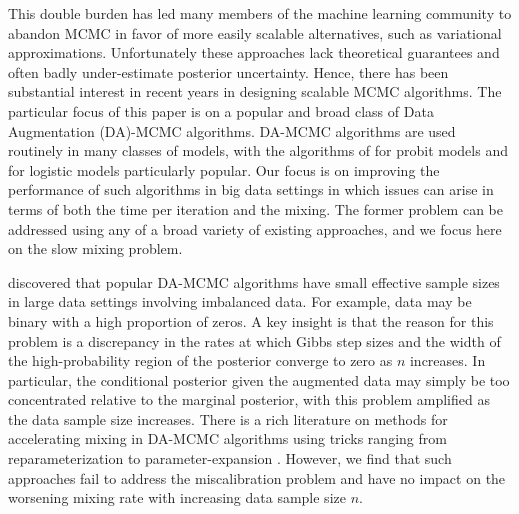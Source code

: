 \documentclass[11pt]{article}
\begin{document}
{This double burden has led many members of the machine learning community to abandon MCMC in favor of more easily scalable alternatives, such as variational approximations. Unfortunately these approaches lack theoretical guarantees and often badly under-estimate posterior uncertainty.  Hence, there has been substantial interest in recent years in designing scalable MCMC algorithms.  The particular focus of this paper is on a popular and broad class of Data Augmentation (DA)-MCMC algorithms.  DA-MCMC algorithms are used routinely in many classes of models, with the algorithms of \cite{albert1993bayesian} for probit models and \cite{polson2013bayesian} for logistic models particularly popular.  Our focus is on improving the performance of such algorithms in big data settings in which issues can arise in terms of both the time per iteration and the mixing.  The former problem can be addressed using any of a broad variety of existing approaches, and we focus here on the slow
mixing problem.}

{ \cite{johndrow2016inefficiency} discovered that popular DA-MCMC algorithms have small effective sample sizes in large data settings involving imbalanced data.  For example, data may be binary with a high proportion of zeros.  A key insight is that the reason for this problem is a discrepancy in the rates at which Gibbs step sizes and the width of the high-probability region of the posterior converge to zero as $n$ increases.  In particular, the conditional posterior given the augmented data may simply be too concentrated relative to the marginal posterior, with this problem amplified as the data sample size increases.  There is a rich literature on methods for accelerating mixing in DA-MCMC algorithms using tricks ranging from reparameterization to parameter-expansion \citep{liu1999parameter,meng1999seeking,papaspiliopoulos2007general}.  However, we find that such approaches fail to address the miscalibration problem and have no impact on the worsening mixing rate with increasing data sample size $n$.}
\end{document}
